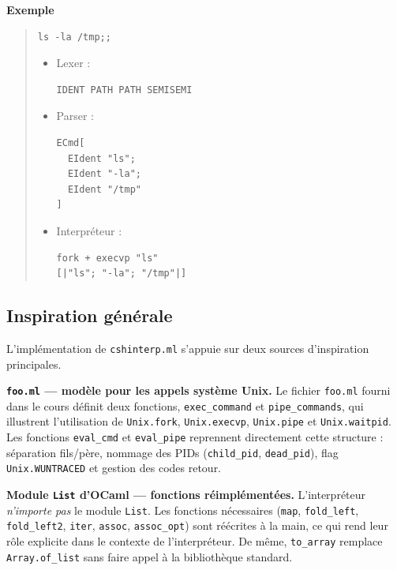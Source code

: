 \documentclass[11pt,a4paper]{article}
\newenvironment{bloc}[1]
{
  \par\medskip
  \noindent\textbf{#1}
  \par
  \smallskip
  \begin{quote}
}
{
  \end{quote}
  \medskip
}
\begin{document}
\begin{bloc}{Exemple}
\begin{lstlisting}
ls -la /tmp;;
\end{lstlisting}

\begin{itemize}
  \item Lexer :
\begin{lstlisting}
IDENT PATH PATH SEMISEMI
\end{lstlisting}

  \item Parser :
\begin{lstlisting}
ECmd[
  EIdent "ls";
  EIdent "-la";
  EIdent "/tmp"
]
\end{lstlisting}

  \item Interpréteur :
\begin{lstlisting}
fork + execvp "ls"
[|"ls"; "-la"; "/tmp"|]
\end{lstlisting}
\end{itemize}
\end{bloc}

\subsection{Inspiration générale}

L'implémentation de \texttt{cshinterp.ml} s'appuie sur deux sources
d'inspiration principales.

\medskip
\textbf{\texttt{foo.ml} --- modèle pour les appels système Unix.}
Le fichier \texttt{foo.ml} fourni dans le cours définit deux fonctions,
\texttt{exec\_command} et \texttt{pipe\_commands}, qui illustrent
l'utilisation de \texttt{Unix.fork}, \texttt{Unix.execvp},
\texttt{Unix.pipe} et \texttt{Unix.waitpid}.
Les fonctions \texttt{eval\_cmd} et \texttt{eval\_pipe} reprennent
directement cette structure : séparation fils/père, nommage des PIDs
(\texttt{child\_pid}, \texttt{dead\_pid}), flag \texttt{Unix.WUNTRACED}
et gestion des codes retour.

\medskip
\textbf{Module \texttt{List} d'OCaml --- fonctions réimplémentées.}
L'interpréteur \emph{n'importe pas} le module \texttt{List}.
Les fonctions nécessaires (\texttt{map}, \texttt{fold\_left},
\texttt{fold\_left2}, \texttt{iter}, \texttt{assoc}, \texttt{assoc\_opt})
sont réécrites à la main, ce qui rend leur rôle explicite dans le
contexte de l'interpréteur. De même, \texttt{to\_array} remplace
\texttt{Array.of\_list} sans faire appel à la bibliothèque standard.
\end{document}
